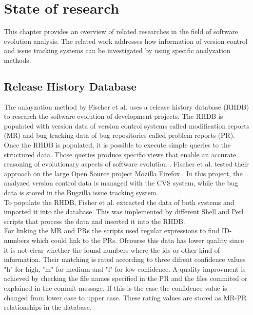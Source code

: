 \section{State of research}
\label{sec:state_of_research}
This chapter provides an overview of related researches in the field of software evolution analysis. The related work addresses how information of version control and issue tracking systems can be investigated by using specific analyzation methods.

\subsection{Release History Database}
The anlayzation method by Fischer et al. \cite{fischer2003populating} uses a release history database (RHDB) to research the software evolution of development projects. The RHDB is populated with version data of version control systems called modification reports (MR) and bug tracking data of bug repositories called problem reports (PR). Once the RHDB is populated, it is possible to execute simple queries to the structured data. Those queries produce specific views that enable an accurate reasoning of evolutionary aspects of software evolution \cite{fischer2003populating}.
Fischer et al. tested their approach on the large Open Source project Mozilla Firefox \cite{mozilla}. In this project, the analyzed version control data is managed with the CVS \cite{cvs} system, while the bug data is stored in the Bugzilla \cite{bugzilla} issue tracking system. \\

To populate the RHDB, Fisher et al. extracted the data of both systems and imported it into the database. This was implemented by different Shell and Perl scripts that process the data and inserted it into the RHDB. \\
For linking the MR and PRs the scripts used regular expressions to find ID-numbers which could link to the PRs. Ofcourse this data has lower quality since it is not clear whether the found numbers where the ids or other kind of information. Their matching is rated according to three difrent confidence values "h" for high, "m" for medium and "l" for low confidence. A quality improvment is achieved by checking the file names specified in the PR and the files commited or explained in the commit message. If this is the case the confidence value is changed from lower case to upper case. These rating values are stored as MR-PR relationships in the database.\\

